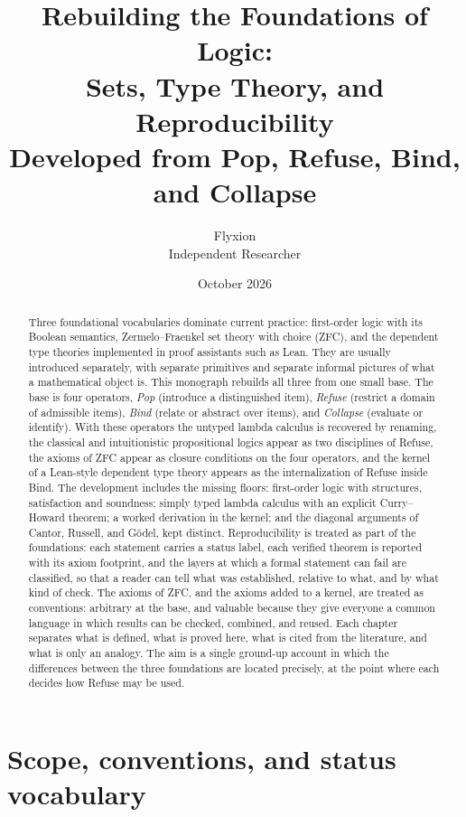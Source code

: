 \documentclass[11pt]{article}
\title{\textbf{Rebuilding the Foundations of Logic:\\ Sets, Type Theory, and Reproducibility}\\[0.4em]
\large Developed from Pop, Refuse, Bind, and Collapse}
\author{Flyxion\\\small Independent Researcher}
\date{October 2026}
\theoremstyle{definition}
\theoremstyle{plain}
\theoremstyle{remark}
\begin{document}
\maketitle

\begin{abstract}
\noindent
Three foundational vocabularies dominate current practice: first-order logic with its Boolean semantics, Zermelo--Fraenkel set theory with choice (ZFC), and the dependent type theories implemented in proof assistants such as Lean. They are usually introduced separately, with separate primitives and separate informal pictures of what a mathematical object is. This monograph rebuilds all three from one small base. The base is four operators, \emph{Pop} (introduce a distinguished item), \emph{Refuse} (restrict a domain of admissible items), \emph{Bind} (relate or abstract over items), and \emph{Collapse} (evaluate or identify). With these operators the untyped lambda calculus is recovered by renaming, the classical and intuitionistic propositional logics appear as two disciplines of Refuse, the axioms of ZFC appear as closure conditions on the four operators, and the kernel of a Lean-style dependent type theory appears as the internalization of Refuse inside Bind. The development includes the missing floors: first-order logic with structures, satisfaction and soundness; simply typed lambda calculus with an explicit Curry--Howard theorem; a worked derivation in the kernel; and the diagonal arguments of Cantor, Russell, and G\"odel, kept distinct. Reproducibility is treated as part of the foundations: each statement carries a status label, each verified theorem is reported with its axiom footprint, and the layers at which a formal statement can fail are classified, so that a reader can tell what was established, relative to what, and by what kind of check. The axioms of ZFC, and the axioms added to a kernel, are treated as conventions: arbitrary at the base, and valuable because they give everyone a common language in which results can be checked, combined, and reused. Each chapter separates what is defined, what is proved here, what is cited from the literature, and what is only an analogy. The aim is a single ground-up account in which the differences between the three foundations are located precisely, at the point where each decides how Refuse may be used.
\end{abstract}

\tableofcontents

\section{Scope, conventions, and status vocabulary}\label{sec:scope}
\end{document}
